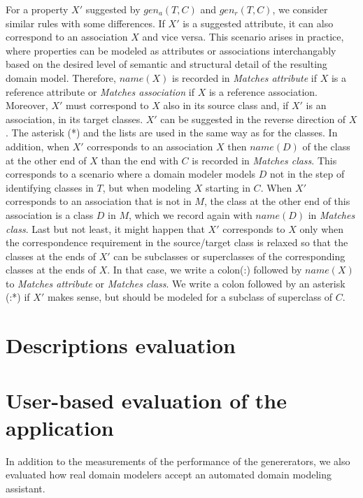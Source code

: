 For a property $X'$ suggested by $gen_a(T,C)$ and $gen_r(T,C)$, we consider similar rules with some differences.
If $X'$ is a suggested attribute, it can also correspond to an association $X$ and vice versa.
This scenario arises in practice, where properties can be modeled as attributes or associations interchangably based on the desired level of semantic and structural detail of the resulting domain model.
Therefore, $name(X)$ is recorded in \emph{Matches attribute} if $X$ is a reference attribute or \emph{Matches association} if $X$ is a reference association.
Moreover, $X'$ must correspond to $X$ also in its source class and, if $X'$ is an association, in its target classes.
$X'$ can be suggested in the reverse direction of $X$.
The asterisk (*) and the lists are used in the same way as for the classes.
In addition, when $X'$ corresponds to an association $X$ then $name(D)$ of the class at the other end of $X$ than the end with $C$ is recorded in \emph{Matches class}.
This corresponds to a scenario where a domain modeler models $D$ not in the step of identifying classes in $T$, but when modeling $X$ starting in $C$.
When $X'$ corresponds to an association that is not in $M$, the class at the other end of this association is a class $D$ in $M$, which we record again with $name(D)$ in \emph{Matches class}.
Last but not least, it might happen that $X'$ corresponds to $X$ only when the correspondence requirement in the source/target class is relaxed so that the classes at the ends of $X'$ can be subclasses or superclasses of the corresponding classes at the ends of $X$.
In that case, we write a colon(:) followed by $name(X)$ to \emph{Matches attribute} or \emph{Matches class}.
We write a colon followed by an asterisk (:*) if $X'$ makes sense, but should be modeled for a subclass of superclass of $C$.



\section{Descriptions evaluation}


\section{User-based evaluation of the application}

In addition to the measurements of the performance of the genererators, we also evaluated how real domain modelers accept an automated domain modeling assistant.


